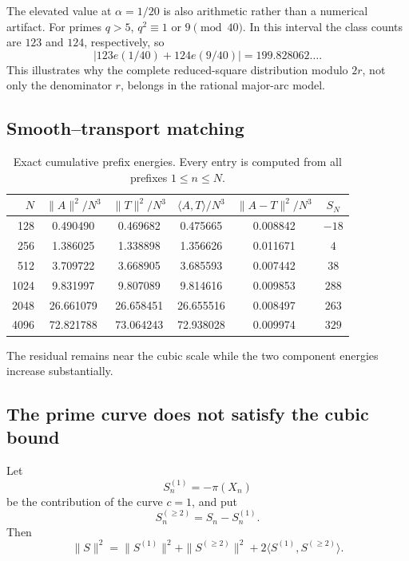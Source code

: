 \documentclass[11pt]{article}
\theoremstyle{definition}
\theoremstyle{remark}
\newcommand{\1}{\mathbf{1}}
\begin{document}
The elevated value at $\alpha=1/20$ is also arithmetic rather than a numerical
artifact.  For primes $q>5$, $q^2\equiv1$ or $9\pmod{40}$.  In this interval the
class counts are $123$ and $124$, respectively, so
\begin{equation}
 \left|123e(1/40)+124e(9/40)\right|
 =199.828062\ldots.
 \label{eq:one-twentieth-secondary-resonance}
\end{equation}
This illustrates why the complete reduced-square distribution modulo $2r$, not only
the denominator $r$, belongs in the rational major-arc model.

\subsection{Smooth--transport matching}

\begin{table}[htbp]
\centering
\caption{Exact cumulative prefix energies.  Every entry is computed
from all prefixes $1\le n\le N$.}
\label{tab:prefix-energy-numerical}
\scriptsize
\setlength{\tabcolsep}{4.2pt}
\begin{tabular}{rccccc}
\toprule
$N$ &
$\|A\|^2/N^3$ &
$\|T\|^2/N^3$ &
$\langle A,T\rangle/N^3$ &
$\|A-T\|^2/N^3$ &
$S_N$\\
\midrule
128  & 0.490490 & 0.469682 & 0.475665 & 0.008842 & $-18$\\
256  & 1.386025 & 1.338898 & 1.356626 & 0.011671 & $4$\\
512  & 3.709722 & 3.668905 & 3.685593 & 0.007442 & $38$\\
1024 & 9.831997 & 9.807089 & 9.814616 & 0.009853 & $288$\\
2048 & 26.661079 & 26.658451 & 26.655516 & 0.008497 & $263$\\
4096 & 72.821788 & 73.064243 & 72.938028 & 0.009974 & $329$\\
\bottomrule
\end{tabular}
\end{table}

The residual remains near the cubic scale while the two component
energies increase substantially.

\subsection{The prime curve does not satisfy the cubic bound}

Let
\[
 S_n^{(1)}=-\pi(X_n)
\]
be the contribution of the curve $c=1$, and put
\[
 S_n^{(\ge2)}=S_n-S_n^{(1)}.
\]
Then
\begin{equation}
 \|S\|^2
 =
 \|S^{(1)}\|^2
 +
 \|S^{(\ge2)}\|^2
 +
 2\langle S^{(1)},S^{(\ge2)}\rangle.
 \label{eq:prime-rest-energy}
\end{equation}
\end{document}
